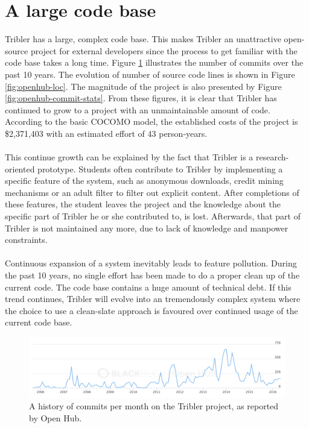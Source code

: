 \section{A large code base}
Tribler has a large, complex code base. This makes Tribler an unattractive open-source project for external developers since the process to get familiar with the code base takes a long time. Figure \ref{fig:openhub-commits} illustrates the number of commits over the past 10 years. The evolution of number of source code lines is shown in Figure \ref{fig:openhub-loc}. The magnitude of the project is also presented by Figure \ref{fig:openhub-commit-stats}. From these figures, it is clear that Tribler has continued to grow to a project with an unmaintainable amount of code. According to the basic COCOMO\cite{kemerer1987empirical} model, the established costs of the project is \$2,371,403 with an estimated effort of 43 person-years.\\\\
This continue growth can be explained by the fact that Tribler is a research-oriented prototype. Students often contribute to Tribler by implementing a specific feature of the system, such as anonymous downloads, credit mining mechanisms or an adult filter to filter out explicit content. After completions of these features, the student leaves the project and the knowledge about the specific part of Tribler he or she contributed to, is lost. Afterwards, that part of Tribler is not maintained any more, due to lack of knowledge and manpower constraints.\\\\
Continuous expansion of a system inevitably leads to feature pollution. During the past 10 years, no single effort has been made to do a proper clean up of the current code. The code base contains a huge amount of technical debt. If this trend continues, Tribler will evolve into an tremendously complex system where the choice to use a clean-slate approach is favoured over continued usage of the current code base.

\begin{figure}[!h]
	\centering
	\includegraphics[width=\columnwidth]{images/problem_description/openhub_commits}
	\caption{A history of commits per month on the Tribler project, as reported by Open Hub.}
	\label{fig:openhub-commits}
\end{figure}


